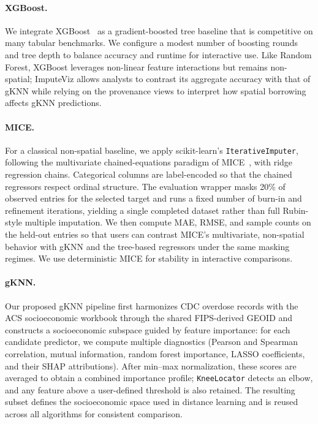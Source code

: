 \documentclass[review]{vgtc}
\newcommand{\gknn}{gKNN\xspace}
\begin{document}
\paragraph*{XGBoost.}
We integrate XGBoost~\cite{Chen2016XGBoost} as a gradient-boosted tree baseline that is competitive on many tabular benchmarks. We configure a modest number of boosting rounds and tree depth to balance accuracy and runtime for interactive use. Like Random Forest, XGBoost leverages non-linear feature interactions but remains non-spatial; ImputeViz allows analysts to contrast its aggregate accuracy with that of \gknn{} while relying on the provenance views to interpret how spatial borrowing affects gKNN predictions.


\paragraph*{MICE.}
For a classical non-spatial baseline, we apply scikit-learn's \texttt{IterativeImputer}, following the multivariate chained-equations paradigm of MICE~\cite{vanBuuren2011mice,VanBuuren2018MICE}, with ridge regression chains. Categorical columns are label-encoded so that the chained regressors respect ordinal structure. The evaluation wrapper masks 20\% of observed entries for the selected target and runs a fixed number of burn-in and refinement iterations, yielding a single completed dataset rather than full Rubin-style multiple imputation. We then compute MAE, RMSE, and sample counts on the held-out entries so that users can contrast MICE's multivariate, non-spatial behavior with \gknn{} and the tree-based regressors under the same masking regimes. We use deterministic MICE for stability in interactive comparisons.

\paragraph*{gKNN.}
Our proposed \gknn{} pipeline first harmonizes CDC overdose records with the ACS socioeconomic workbook through the shared FIPS-derived GEOID and constructs a socioeconomic subspace guided by feature importance: for each candidate predictor, we compute multiple diagnostics (Pearson and Spearman correlation, mutual information, random forest importance, LASSO coefficients, and their SHAP attributions). After min--max normalization, these scores are averaged to obtain a combined importance profile; \texttt{KneeLocator} detects an elbow, and any feature above a user-defined threshold is also retained. The resulting subset defines the socioeconomic space used in distance learning and is reused across all algorithms for consistent comparison.
\end{document}
